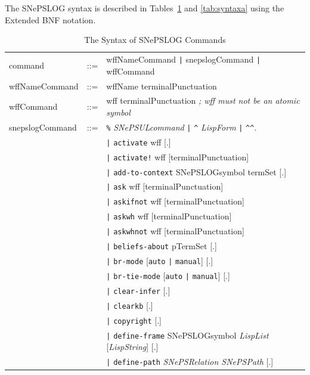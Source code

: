 \documentclass{book}
\begin{document}
The SNePSLOG syntax is described in Tables~\ref{tab:syntaxb} and
\ref{tab:syntaxa} using the Extended BNF notation.  
\begin{table}[hbp]
  \centering
  \caption{The Syntax of SNePSLOG Commands}
  \label{tab:syntaxb}
\begin{tabular}{|lcl|}\hline
command  &::=& wffNameCommand \verb.|. snepslogCommand \verb.|. wffCommand\\
wffNameCommand   &::=& wffName terminalPunctuation\\
wffCommand       &::=& wff terminalPunctuation \textit{; wff must not
  be an atomic symbol}\\
snepslogCommand &::=& \texttt{\%} \textit{SNePSULcommand}
                      \verb.|. \verb.^. \textit{LispForm} \verb.|. \verb.^^. \\
                 && \verb.|. \texttt{activate} wff [.]\\
                 && \verb.|. \texttt{activate!} wff [terminalPunctuation]\\
                 && \verb.|. \texttt{add-to-context} SNePSLOGsymbol termSet [.]\\
                 && \verb.|. \texttt{ask} wff [terminalPunctuation]\\
                 && \verb.|. \texttt{askifnot} wff [terminalPunctuation]\\
                 && \verb.|. \texttt{askwh} wff [terminalPunctuation]\\
                 && \verb.|. \texttt{askwhnot} wff [terminalPunctuation]\\
                 && \verb.|. \texttt{beliefs-about} pTermSet [.]\\
                 && \verb.|. \texttt{br-mode} [\texttt{auto}
                 \verb.|. \texttt{manual}] [.]\\
                 && \verb.|. \texttt{br-tie-mode} [\texttt{auto}
                 \verb.|. \texttt{manual}] [.]\\
                 && \verb.|. \texttt{clear-infer} [.]\\
                 && \verb.|. \texttt{clearkb} [.]\\
                 && \verb.|. \texttt{copyright} [.]\\
                 && \verb.|. \texttt{define-frame} SNePSLOGsymbol
                                \textit{LispList} [\textit{LispString}] [.]\\
                 && \verb.|. \texttt{define-path} \textit{SNePSRelation SNePSPath} [.]\\

\end{tabular}
\end{table}
\end{document}
